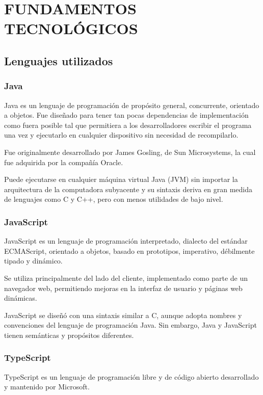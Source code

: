 \chapter[Fundamentos tecnológicos]{
  \label{chp:fundamentos}
  FUNDAMENTOS TECNOLÓGICOS
}

\thispagestyle{numberingStyle}
\pagestyle{numberingStyle}


\section{Lenguajes utilizados}
\subsection{Java}
Java es un lenguaje de programación de propósito general, concurrente, orientado a objetos. Fue diseñado para tener tan pocas dependencias de implementación como fuera posible tal que permitiera a los desarrolladores escribir el programa una vez y ejecutarlo en cualquier dispositivo sin necesidad de recompilarlo.

Fue originalmente desarrollado por James Gosling, de Sun Microsystems, la cual fue adquirida por la compañía Oracle.

Puede ejecutarse en cualquier máquina virtual Java (JVM) sin importar la arquitectura de la computadora subyacente y su sintaxis deriva en gran medida de lenguajes como C y C++, pero con menos utilidades de bajo nivel.

\subsection{JavaScript}
JavaScript es un lenguaje de programación interpretado, dialecto del estándar ECMAScript, orientado a objetos, basado en prototipos, imperativo, débilmente tipado y dinámico.

Se utiliza principalmente del lado del cliente, implementado como parte de un navegador web, permitiendo mejoras en la interfaz de usuario y páginas web dinámicas.

JavaScript se diseñó con una sintaxis similar a C, aunque adopta nombres y convenciones del lenguaje de programación Java. Sin embargo, Java y JavaScript tienen semánticas y propósitos diferentes.

\subsection{TypeScript}
TypeScript es un lenguaje de programación libre y de código abierto desarrollado y mantenido por Microsoft.

